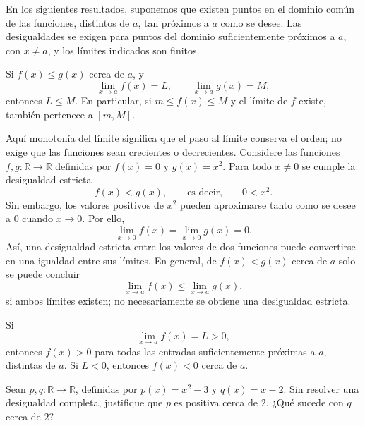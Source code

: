 \documentclass[10pt,a5paper]{article}
\newif\ifmostrarSoluciones
\begin{document}
En los siguientes resultados, suponemos que existen puntos en el dominio común de las funciones, distintos de $a$, tan próximos a $a$ como se desee. Las desigualdades se exigen para puntos del dominio suficientemente próximos a $a$, con $x\neq a$, y los límites indicados son finitos.

\begin{teorema}
Si $f(x)\leq g(x)$ cerca de $a$, y
\[
\lim_{x\to a}f(x)=L,\qquad \lim_{x\to a}g(x)=M,
\]
entonces $L\leq M$. En particular, si $m\leq f(x)\leq M$ y el límite de $f$ existe, también pertenece a $[m,M]$.
\end{teorema}

\begin{nota}
Aquí monotonía del límite significa que el paso al límite conserva el orden; no exige que las funciones sean crecientes o decrecientes. Considere las funciones $f,g\colon\mathbb{R}\to\mathbb{R}$ definidas por $f(x)=0$ y $g(x)=x^2$. Para todo $x\neq0$ se cumple la desigualdad estricta
\[
  f(x)<g(x),
  \qquad\text{es decir,}\qquad
  0<x^2.
\]
Sin embargo, los valores positivos de $x^2$ pueden aproximarse tanto como se desee a $0$ cuando $x\to0$. Por ello,
\[
  \lim_{x\to0}f(x)
  =\lim_{x\to0}g(x)
  =0.
\]
Así, una desigualdad estricta entre los valores de dos funciones puede convertirse en una igualdad entre sus límites. En general, de $f(x)<g(x)$ cerca de $a$ solo se puede concluir
\[
  \lim_{x\to a}f(x)
  \leq
  \lim_{x\to a}g(x),
\]
si ambos límites existen; no necesariamente se obtiene una desigualdad estricta.
\end{nota}

\begin{teorema}
Si
\[
  \lim_{x\to a}f(x)=L>0,
\]
entonces $f(x)>0$ para todas las entradas suficientemente próximas a $a$, distintas de $a$. Si $L<0$, entonces $f(x)<0$ cerca de $a$.
\end{teorema}

\begin{ejemplo}
Sean $p,q\colon\mathbb{R}\to\mathbb{R}$, definidas por $p(x)=x^2-3$ y $q(x)=x-2$. Sin resolver una desigualdad completa, justifique que $p$ es positiva cerca de $2$. ¿Qué sucede con $q$ cerca de $2$?
\end{ejemplo}
\ifmostrarSoluciones
\begin{solucion}
Como
\[
  \lim_{x\to2}p(x)=1>0,
\]
el signo de $p$ es positivo cerca de $2$. En cambio,
\[
  \lim_{x\to2}q(x)=0:
\]
$q$ es negativa a la izquierda y positiva a la derecha. Un límite nulo no garantiza preservación de un signo estricto.
\end{solucion}
\else\vspace{18mm}\fi
\end{document}

